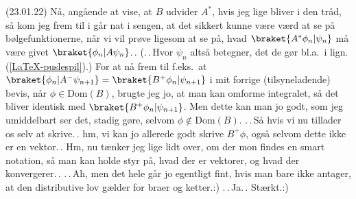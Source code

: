 \documentclass{report}
\begin{document}
(23.01.22) Nå, angående at vise, at $B$ udvider $A^*$, hvis jeg lige bliver i den tråd, så kom jeg frem til i går nat i sengen, at det sikkert kunne være værd at se på bølgefunktionerne, når vi vil prøve ligesom at se på, hvad $\braket{A^* \phi_n | \psi_n}$ må være givet $\braket{\phi_n | A \psi_n}$.\,. (.\,.\,Hvor $\psi_n$ altså betegner, det de gør bl.a.\ i lign. (\ref{LaTeX-puslespil}).) For at nå frem til f.eks.\ at $\braket{\phi_n | A^- \psi_{n+1}}= \braket{B^+ \phi_n | \psi_{n+1}}$ i mit forrige (tilsyneladende) bevis, når $\phi\in\mathrm{Dom}(B)$, brugte jeg jo, at man kan omforme integralet, så det bliver identisk med $\braket{B^+ \phi_n | \psi_{n+1}}$. Men dette kan man jo godt, som jeg umiddelbart ser det, stadig gøre, selvom $\phi\notin\mathrm{Dom}(B)$. .\,.\,Så hvis vi nu tillader os selv at skrive.\,. hm, vi kan jo allerede godt skrive $B^+\phi$, også selvom dette ikke er en vektor.\,. Hm, nu tænker jeg lige lidt over, om der mon findes en smart notation, så man kan holde styr på, hvad der er vektorer, og hvad der konvergerer.\,. .\,.\,Ah, men det hele går jo egentligt fint, hvis man bare ikke antager, at den distributive lov gælder for braer og ketter.:) .\,.\,Ja.\,. Stærkt.:) 
\end{document}
